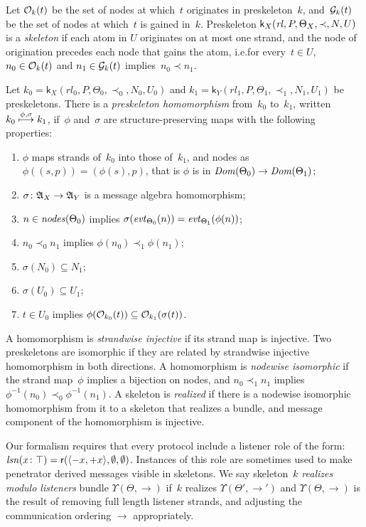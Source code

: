 \documentclass[12pt]{article}
\theoremstyle{definition}
\newcommand{\alga}{\alg{A}}
\newcommand{\sdom}{\fn{Dom}}
\newcommand{\evt}{\fn{evt}}
\newcommand{\role}{\mathsf{r}}
\newcommand{\skel}{\mathsf{k}}
\newcommand{\rl}{\fn{rl}}
\newcommand{\nodes}{\fn{nodes}}
\newcommand{\lsn}{\fn{lsn}}
\begin{document}
\begin{sloppypar}
Let $\mathcal{O}_k(t)$ be the set of nodes at which~$t$ originates in
preskeleton~$k$, and~$\mathcal{G}_k(t)$ be the set of nodes at which~$t$ is
gained in~$k$.  Preskeleton $\skel_X(\rl,P,\Theta_X,\prec,N,U)$ is a
\emph{skeleton} if each atom in $U$ originates on at most one strand,
and the node of origination precedes each node that gains the atom,
i.e.\@ for every~$t\in U$, $n_0\in\mathcal{O}_k(t)$ and $n_1\in\mathcal{G}_k(t)$
implies~$n_0\prec n_1$.
\end{sloppypar}

Let $k_0=\skel_X(rl_0,P,\Theta_0,\prec_0,N_0,U_0)$ and
$k_1=\skel_Y(rl_1,P,\Theta_1,\prec_1,N_1,U_1)$ be preskeletons.  There
is a \emph{preskeleton homomorphism} from~$k_0$ to~$k_1$,
written~$k_0\stackrel{\phi,\sigma}{\longmapsto}k_1$, if~$\phi$ and~$\sigma$ are
structure-preserving maps with the following properties:
\begin{enumerate}
\item $\phi$ maps strands of~$k_0$ into those of~$k_1$, and nodes as
  $\phi((s,p))=(\phi(s),p)$, that is $\phi$ is in
  $\sdom(\Theta_0)\to\sdom(\Theta_1)$;
\item $\sigma\colon\alga_X\to\alga_Y$ is a message algebra homomorphism;
\item $n\in\nodes(\Theta_0)$ implies $\sigma(\evt_{\Theta_0}(n))=\evt_{\Theta_1}(\phi(n))$;
\item $n_0\prec_0 n_1$ implies $\phi(n_0)\prec_1\phi(n_1)$;
\item $\sigma(N_0)\subseteq N_1$;
\item $\sigma(U_0)\subseteq U_1$;
\item $t\in U_0$ implies $\phi(\mathcal{O}_{k_0}(t))\subseteq\mathcal{O}_{k_1}(\sigma(t))$.
\end{enumerate}
A homomorphism is \emph{strandwise injective} if its strand map is
injective.  Two preskeletons are isomorphic if they are related by
strandwise injective homomorphism in both directions.  A homomorphism
is \emph{nodewise isomorphic} if the strand map~$\phi$ implies a
bijection on nodes, and $n_0\prec_1 n_1$ implies
$\phi^{-1}(n_0)\prec_0\phi^{-1}(n_1)$.  A skeleton is \emph{realized}
if there is a nodewise isomorphic homomorphism from it to a skeleton
that realizes a bundle, and message component of the homomorphism
is injective.

Our formalism requires that every protocol include a listener role of
the form: $\lsn(x\colon\top)=\role(\seq{\inbnd x,\outbnd
  x},\emptyset,\emptyset)$.  Instances of this role are sometimes used
to make penetrator derived messages visible in skeletons.  We say
skeleton~$k$ \emph{realizes modulo listeners} bundle
$\Upsilon(\Theta,\to) $ if~$k$ realizes $\Upsilon(\Theta',\to')$ and
\hbox{$\Upsilon(\Theta,\to)$} is the result of removing full length listener
strands, and adjusting the communication ordering $\to$ appropriately.
\end{document}
